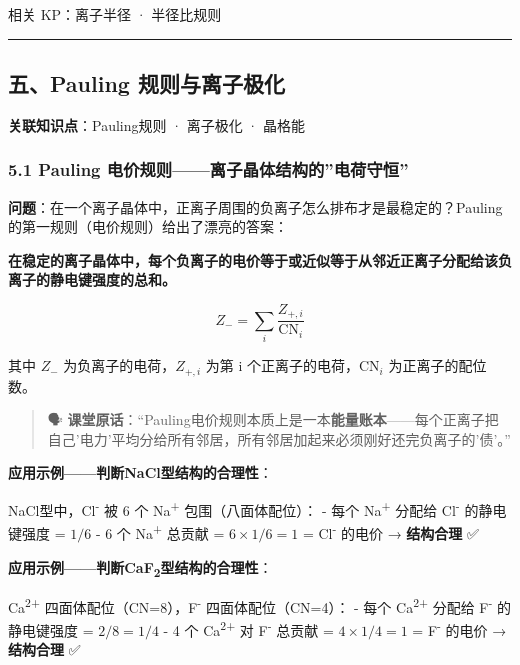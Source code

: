 \documentclass[a4paper,11pt]{ctexart}
\begin{document}
相关 KP：离子半径 · 半径比规则

\begin{center}\rule{0.5\linewidth}{0.5pt}\end{center}

\subsection{五、Pauling 规则与离子极化}\label{ux4e94pauling-ux89c4ux5219ux4e0eux79bbux5b50ux6781ux5316}

\textbf{关联知识点}：Pauling规则 · 离子极化 · 晶格能

\subsubsection{5.1 Pauling 电价规则------离子晶体结构的''电荷守恒''}\label{pauling-ux7535ux4ef7ux89c4ux5219ux79bbux5b50ux6676ux4f53ux7ed3ux6784ux7684ux7535ux8377ux5b88ux6052}

\textbf{问题}：在一个离子晶体中，正离子周围的负离子怎么排布才是最稳定的？Pauling 的第一规则（电价规则）给出了漂亮的答案：

\textbf{在稳定的离子晶体中，每个负离子的电价等于或近似等于从邻近正离子分配给该负离子的静电键强度的总和。}

\[
Z_- = \sum_i \frac{Z_{+,i}}{\text{CN}_i}
\]

其中 \(Z_-\) 为负离子的电荷，\(Z_{+,i}\) 为第 i 个正离子的电荷，\(\text{CN}_i\) 为正离子的配位数。

\begin{quote}
🗣️ \textbf{课堂原话}：``Pauling电价规则本质上是一本\textbf{能量账本}------每个正离子把自己'电力'平均分给所有邻居，所有邻居加起来必须刚好还完负离子的'债'。''
\end{quote}

\textbf{应用示例------判断NaCl型结构的合理性}：

NaCl型中，Cl\textsuperscript{-} 被 6 个 Na\textsuperscript{+} 包围（八面体配位）：
- 每个 Na\textsuperscript{+} 分配给 Cl\textsuperscript{-} 的静电键强度 = \(1/6\)
- 6 个 Na\textsuperscript{+} 总贡献 = \(6 \times 1/6 = 1\) = Cl\textsuperscript{-} 的电价 → \textbf{结构合理} ✅

\textbf{应用示例------判断CaF\textsubscript{2}型结构的合理性}：

Ca\textsuperscript{2+} 四面体配位（CN=8），F\textsuperscript{-} 四面体配位（CN=4）：
- 每个 Ca\textsuperscript{2+} 分配给 F\textsuperscript{-} 的静电键强度 = \(2/8 = 1/4\)
- 4 个 Ca\textsuperscript{2+} 对 F\textsuperscript{-} 总贡献 = \(4 \times 1/4 = 1\) = F\textsuperscript{-} 的电价 → \textbf{结构合理} ✅
\end{document}
